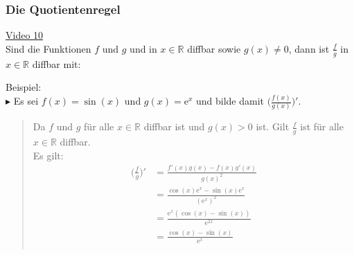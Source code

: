 \subsubsection{Die Quotientenregel}
\href{https://youtu.be/tA1GHaDpCYE}{Video 10}\\
Sind die Funktionen $ f $ und $ g $ und in $ x\in\mathbb{R} $ diffbar sowie $ g(x)\neq 0 $, dann ist $ \frac{f}{g} $ in $ x\in\mathbb{R} $ diffbar mit:\\
\begin{center}
\end{center}
\newpage
\noindent
Beispiel:\\
$\blacktriangleright$ Es sei $ f(x)=\sin(x) $ und $ g(x) =\mathrm{e}^x$ und bilde damit $ \bigg( \frac{f(x)}{g(x)}\bigg)' $.\\
\begin{quote}
	Da $ f $ und $ g $ für alle $ x\in\mathbb{R} $ diffbar ist und $ g(x)>0 $ ist. Gilt $\frac{f}{g}  $ ist für alle $ x\in\mathbb{R} $ diffbar.\\
	Es gilt:\\
	\begin{align*}
	\bigg(\frac{f}{g}\bigg)'&=\frac{f'(x)g(x)-f(x)g'(x)}{g(x)^2}\\
	&=\frac{\cos(x)\mathrm{e}^x-\sin(x)\mathrm{e}^x}{(\mathrm{e}^x)^2}\\
	&=\frac{\mathrm{e}^x(\cos(x)-\sin(x))}{\mathrm{e}^{2x}}\\
	&=\frac{\cos(x)-\sin(x)}{\mathrm{e}^x}\\
	\end{align*}
\end{quote}
